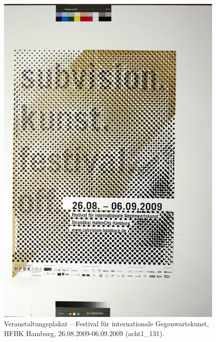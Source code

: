 \documentclass[a4paper,12pt,ngerman]{article}
\begin{document}
\newpage
\begin{figure}[ht]
\includegraphics[width=\linewidth]{Abbildung_19_(acht1_131)}
\centering
\caption{Veranstaltungsplakat -- Festival für internationale Gegenwartskunst, HFBK Hamburg, 26.08.2009-06.09.2009 (acht1\_131).}
\end{figure}
\end{document}
